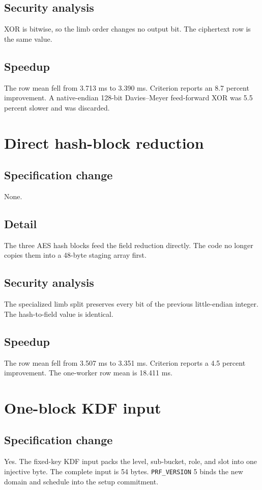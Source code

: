 \documentclass[10pt]{article}
\begin{document}
\subsection{Security analysis}
XOR is bitwise, so the limb order changes no output bit.
The ciphertext row is the same value.

\subsection{Speedup}
The row mean fell from 3.713 ms to 3.390 ms.
Criterion reports an 8.7 percent improvement.
A native-endian 128-bit Davies--Meyer feed-forward XOR was 5.5 percent slower and was discarded.

\section{Direct hash-block reduction}
\label{sec:o9}

\subsection{Specification change}
None.

\subsection{Detail}
The three AES hash blocks feed the field reduction directly.
The code no longer copies them into a 48-byte staging array first.

\subsection{Security analysis}
The specialized limb split preserves every bit of the previous little-endian integer.
The hash-to-field value is identical.

\subsection{Speedup}
The row mean fell from 3.507 ms to 3.351 ms.
Criterion reports a 4.5 percent improvement.
The one-worker row mean is 18.411 ms.

\section{One-block KDF input}
\label{sec:o10}

\subsection{Specification change}
Yes.
The fixed-key KDF input packs the level, sub-bucket, role, and slot into one injective byte.
The complete input is 54 bytes.
\texttt{PRF\_VERSION} 5 binds the new domain and schedule into the setup commitment.
\end{document}
